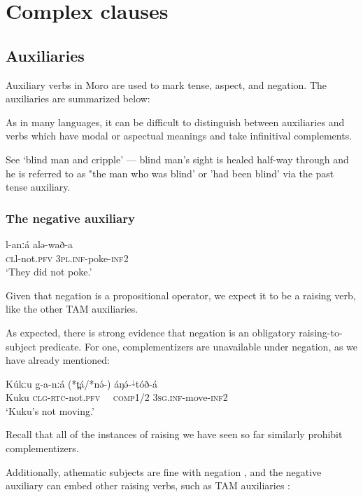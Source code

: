 \part{Complex clauses}

\chapter{Auxiliaries}\label{chapter:auxiliaries}

Auxiliary verbs in Moro are used to mark tense, aspect, and negation. The auxiliaries are summarized below:

As in many languages, it can be difficult to distinguish between auxiliaries and verbs which have modal or aspectual meanings and take infinitival complements.

See `blind man and cripple' --- blind man's sight is healed half-way through and he is referred to as "the man who was blind' or 'had been blind' via the past tense auxiliary.

\section{The negative auxiliary}\label{sec:ch14:negaux}

\ea \gll  	l-anːá               alə-wað-a	\\
\textsc{cl}l-not.\textsc{pfv}   \textsc{3pl.inf}-poke-\textsc{inf2}\\
\glt ‘They did not poke.’
\z 

Given that negation is a propositional operator, we expect it to be a raising verb, like the other TAM auxiliaries. 

As expected, there is strong evidence that negation is an obligatory raising-to-subject predicate. For one, complementizers are unavailable under negation, as we have already mentioned: 

\ea \gll  Kúkːu g-a-nːá (*t̪á/*nə́-) áŋə́-$^{↓}$tóð-á\\
Kuku \textsc{clg}-\textsc{rtc}-not.\textsc{pfv}   {\ \ \textsc{comp1/2}} \textsc{3sg.inf}-move-\textsc{inf2}\\
\glt ‘Kuku’s not moving.’
\z 

Recall that all of the instances of raising we have seen so far similarly prohibit complementizers.

Additionally, athematic subjects are fine with negation \Next, and the negative auxiliary can embed other raising verbs, such as TAM auxiliaries \NNext:


